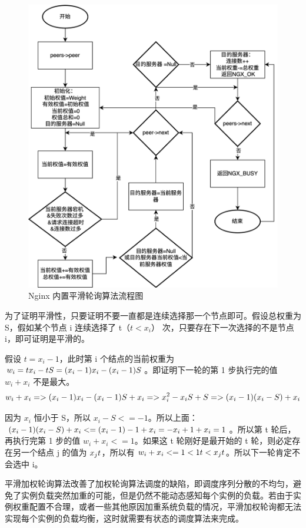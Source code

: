 \begin{figure}[htbp]
	\centering
	\includegraphics[width=.8\textwidth]{figures/smooth_weight.png}
	\caption{Nginx 内置平滑轮询算法流程图}
	\label{pinghualunxun}
\end{figure}

为了证明平滑性，只要证明不要一直都是连续选择那一个节点即可。假设总权重为 S，假如某个节点 i 连续选择了 t（$t < x_i$） 次，只要存在下一次选择的不是节点 i，即可证明是平滑的。

假设 $t = x_i - 1$，此时第 i 个结点的当前权重为 $w_i = t \* x_i - t \* S = (x_i - 1) \* x_i - (x_i - 1) \* S$。即证明下一轮的第 1 步执行完的值 $w_i + x_i$ 不是最大。
\begin{equation}
	w_i + x_i => (x_i - 1) \* x_i - (x_i - 1) \* S + x_i =>x_i^2 - x_i \* S + S => (x_i - 1) \* (x_i - S) + x_i
\end{equation}

因为 $x_i$ 恒小于 S，所以 $x_i - S <= -1$。所以上面：$(x_i - 1) \* (x_i - S) + x_i <= (x_i - 1) \* -1 + x_i = -x_i + 1 + x_i = 1$。所以第 t 轮后，再执行完第 1 步的值 $w_i + x_i <= 1$。如果这 t 轮刚好是最开始的 t 轮，则必定存在另一个结点 j 的值为 $x_j \* t$，所以有 $w_i + x_i <= 1 < 1 \* t < x_j \* t$。所以下一轮肯定不会选中 i。

平滑加权轮询算法改善了加权轮询算法调度的缺陷，即调度序列分散的不均匀，避免了实例负载突然加重的可能，但是仍然不能动态感知每个实例的负载。若由于实例权重配置不合理，或者一些其他原因加重系统负载的情况，平滑加权轮询都无法实现每个实例的负载均衡，这时就需要有状态的调度算法来完成。

